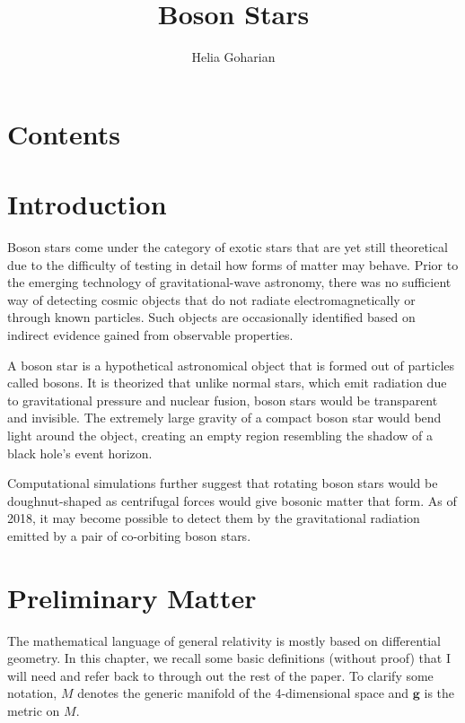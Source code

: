 \documentclass[12pt]{article}
\title{Boson Stars}
\author{Helia Goharian }
\date{}
\renewcommand{\vec}[1]{\bm{#1}}
\numberwithin{equation}{section}
\numberwithin{theorem}{subsection}
\begin{document}
\maketitle

\section{Contents}

\section{Introduction}

Boson stars come under the category of exotic stars that are yet still theoretical due to the difficulty of testing in detail how forms of matter may behave. Prior to the emerging technology of gravitational-wave astronomy, there was no sufficient way of detecting cosmic objects that do not radiate electromagnetically or through known particles. Such objects are occasionally identified based on indirect evidence gained from observable properties. 

\newline

A boson star is a hypothetical astronomical object that is formed out of particles called bosons. It is theorized that unlike normal stars, which emit radiation due to gravitational pressure and nuclear fusion, boson stars would be transparent and invisible. The extremely large gravity of a compact boson star would bend light around the object, creating an empty region resembling the shadow of a black hole's event horizon.

\newline

Computational simulations further suggest that rotating boson stars would be doughnut-shaped as centrifugal forces would give bosonic matter that form. As of 2018, it may become possible to detect them by the gravitational radiation emitted by a pair of co-orbiting boson stars.


\section{Preliminary Matter}

The mathematical language of general relativity is mostly based on differential geometry. In this chapter, we recall some basic definitions (without proof) that I will need and refer back to through out the rest of the paper. To clarify some notation, $M$ denotes the generic manifold of the 4-dimensional space and $\vec{g}$ is the metric on $M$.
\end{document}
